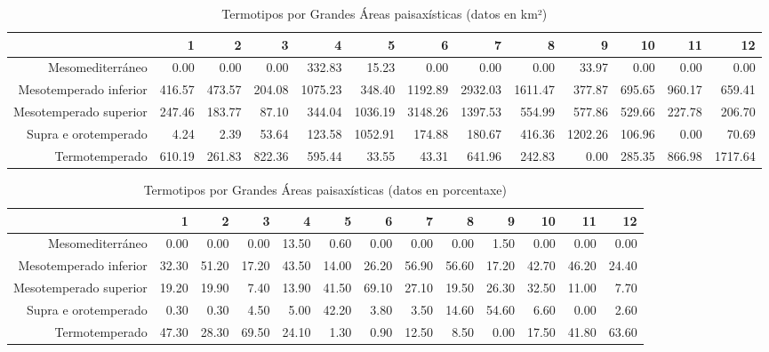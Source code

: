 \begin{table}[p]
\centering
\caption{Termotipos por Grandes Áreas paisaxísticas (datos en km²)} 
\label{xtaboa3}
\begin{tabular}{rrrrrrrrrrrrr}
  \hline
 & 1 & 2 & 3 & 4 & 5 & 6 & 7 & 8 & 9 & 10 & 11 & 12 \\ 
  \hline
Mesomediterráneo & 0.00 & 0.00 & 0.00 & 332.83 & 15.23 & 0.00 & 0.00 & 0.00 & 33.97 & 0.00 & 0.00 & 0.00 \\ 
  Mesotemperado inferior & 416.57 & 473.57 & 204.08 & 1075.23 & 348.40 & 1192.89 & 2932.03 & 1611.47 & 377.87 & 695.65 & 960.17 & 659.41 \\ 
  Mesotemperado superior & 247.46 & 183.77 & 87.10 & 344.04 & 1036.19 & 3148.26 & 1397.53 & 554.99 & 577.86 & 529.66 & 227.78 & 206.70 \\ 
  Supra e orotemperado & 4.24 & 2.39 & 53.64 & 123.58 & 1052.91 & 174.88 & 180.67 & 416.36 & 1202.26 & 106.96 & 0.00 & 70.69 \\ 
  Termotemperado & 610.19 & 261.83 & 822.36 & 595.44 & 33.55 & 43.31 & 641.96 & 242.83 & 0.00 & 285.35 & 866.98 & 1717.64 \\ 
   \hline
\end{tabular}
\end{table}
\begin{table}[p]
\centering
\caption{Termotipos por Grandes Áreas paisaxísticas (datos en porcentaxe)} 
\label{xtaboa3p}
\begin{tabular}{rrrrrrrrrrrrr}
  \hline
 & 1 & 2 & 3 & 4 & 5 & 6 & 7 & 8 & 9 & 10 & 11 & 12 \\ 
  \hline
Mesomediterráneo & 0.00 & 0.00 & 0.00 & 13.50 & 0.60 & 0.00 & 0.00 & 0.00 & 1.50 & 0.00 & 0.00 & 0.00 \\ 
  Mesotemperado inferior & 32.30 & 51.20 & 17.20 & 43.50 & 14.00 & 26.20 & 56.90 & 56.60 & 17.20 & 42.70 & 46.20 & 24.40 \\ 
  Mesotemperado superior & 19.20 & 19.90 & 7.40 & 13.90 & 41.50 & 69.10 & 27.10 & 19.50 & 26.30 & 32.50 & 11.00 & 7.70 \\ 
  Supra e orotemperado & 0.30 & 0.30 & 4.50 & 5.00 & 42.20 & 3.80 & 3.50 & 14.60 & 54.60 & 6.60 & 0.00 & 2.60 \\ 
  Termotemperado & 47.30 & 28.30 & 69.50 & 24.10 & 1.30 & 0.90 & 12.50 & 8.50 & 0.00 & 17.50 & 41.80 & 63.60 \\ 
   \hline
\end{tabular}
\end{table}
